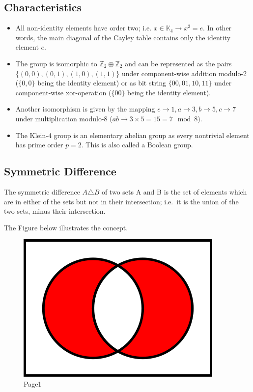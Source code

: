\subsection{Characteristics}\label{characteristics}

\begin{itemize}
\item
  All non-identity elements have order two; i.e.
  \(x \in \mathbb{K}_4 \rightarrow x^2 = e\). In other words, the main
  diagonal of the Cayley table contains only the identity element \(e\).
\item
  The group is isomorphic to \(\mathbb{Z}_2 \oplus \mathbb{Z}_2\) and
  can be represented as the pairs \(\{(0,0), (0,1), (1,0), (1,1)\}\)
  under component-wise addition modulo-2 (\(\{0,0\}\) being the identity
  element) or as bit string \(\{00, 01, 10, 11\}\) under component-wise
  xor-operation (\(\{00\}\) being the identity element).
\item
  Another isomorphism is given by the mapping
  \(e \rightarrow 1, a \rightarrow 3, b \rightarrow 5, c \rightarrow 7\)
  under multiplication modulo-8
  (\(a b \rightarrow 3 \times 5 = 15 = 7 \mod 8\)).
\item
  The Klein-4 group is an elementary abelian group as every nontrivial
  element has prime order \(p = 2\). This is also called a Boolean
  group.
\end{itemize}

\subsection{Symmetric Difference}\label{symmetric-difference}

The symmetric difference \(A \triangle B\) of two sets A and B is the
set of elements which are in either of the sets but not in their
intersection; i.e.~it is the union of the two sets, minus their
intersection.

The Figure below illustrates the concept.

\begin{figure}
\centering
\includegraphics{images/symmetric_difference.png}
\caption{Page1}
\end{figure}

